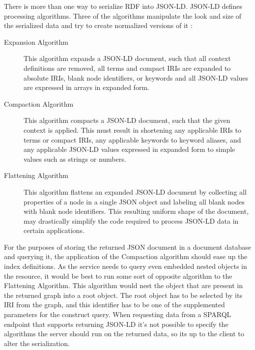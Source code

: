 There is more than one way to serialize RDF into JSON-LD. JSON-LD defines processing algorithms. Three of the algorithms manipulate the look and size of the serialized data and try to create normalized versions of it \cite{onlineW3CJsonLdAlgorithmsSpec}:
\begin{description}
	\item[Expansion Algorithm] This algorithm expands a JSON-LD document, such that all context definitions are removed, all terms and compact IRIs are expanded to absolute IRIs, blank node identifiers, or keywords and all JSON-LD values are expressed in arrays in expanded form.
	\item[Compaction Algorithm] This algorithm compacts a JSON-LD document, such that the given context is applied. This must result in shortening any applicable IRIs to terms or compact IRIs, any applicable keywords to keyword aliases, and any applicable JSON-LD values expressed in expanded form to simple values such as strings or numbers.
	\item[Flattening Algorithm] This algorithm flattens an expanded JSON-LD document by collecting all properties of a node in a single JSON object and labeling all blank nodes with blank node identifiers. This resulting uniform shape of the document, may drastically simplify the code required to process JSON-LD data in certain applications.
\end{description}
For the purposes of storing the returned JSON document in a document database and querying it, the application of the Compaction algorithm should ease up the index definitions. 
As the service needs to query even embedded nested objects in the resource, it would be best to run some sort of opposite algorithm to the Flattening Algorithm. This algorithm would nest the object that are present in the returned 
graph into a root object. The root object has to be selected by its IRI from the graph, and this identifier has to be one of the supplemented parameters for the construct query. 
When requesting data from a SPARQL endpoint that supports returning JSON-LD it's not possible to specify the algorithms the server should run on the returned data, so its up to the client to alter the serialization.




